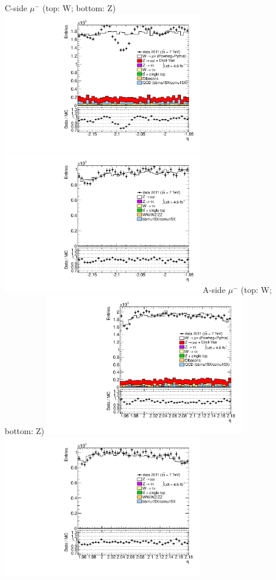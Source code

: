  {
\colb[T]
C-side $\mu^{-}$ (top: W; bottom: Z)
\centering
\includegraphics[width=0.66\textwidth]{dates/20130306/figures/etaphi/WpItoK_10_C_stack_l_eta_NEG} \\
\includegraphics[width=0.66\textwidth]{dates/20130306/figures/etaphi/Z_10_C_stack_lN_eta_ALL.pdf}
A-side $\mu^{-}$ (top: W; bottom: Z)
\centering
\includegraphics[width=0.66\textwidth]{dates/20130306/figures/etaphi/WpItoK_10_A_stack_l_eta_NEG} \\
\includegraphics[width=0.66\textwidth]{dates/20130306/figures/etaphi/Z_10_A_stack_lN_eta_ALL.pdf} 
\cole
}
